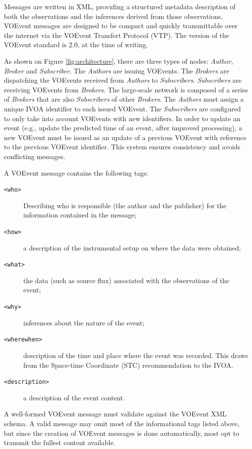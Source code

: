 \documentclass[referee,a4paper,12pt,traditabstract]{swsc}
\begin{document}
\begin{linenumbers}
Messages are written in XML, providing a structured metadata description of both the observations and the inferences derived from those observations. VOEvent messages are designed to be compact and quickly transmittable over the internet via the VOEvent Transfert Protocol (VTP). The version of the VOEvent standard is 2.0, at the time of writing.

As shown on Figure \ref{fig:architecture}, there are three types of nodes: \emph{Author}, \emph{Broker} and \emph{Subscriber}.  The \emph{Authors} are issuing VOEvents. The \emph{Brokers} are dispatching the VOEvents received from \emph{Authors} to \emph{Subscribers}. \emph{Subscribers} are receiving VOEvents from \emph{Brokers}. The large-scale network is composed of a series of \emph{Brokers} that are also \emph{Subscribers} of other \emph{Brokers}. The \emph{Authors} must assign a unique IVOA identifier \cite{ivoid} to each issued VOEvent. The \emph{Subscribers} are configured to only take into account VOEvents with new identifiers. In order to update an event (e.g., update the predicted time of an event, after improved processing), a new VOEvent must be issued as an update of a previous VOEvent with reference to the previous VOEvent identifier. This system ensures consistency and avoids conflicting messages. 

A VOEvent message contains the following tags:
\begin{description}
\item[{\tt <who>}] Describing who is responsible (the author and the publisher) for the information contained in the message;
\item[{\tt <how>}] a description of the instrumental setup on where the data were obtained;
\item[{\tt <what>}] the data (such as source flux) associated with the observations of the event;
\item[{\tt <why>}] inferences about the nature of the event;
\item[{\tt <wherewhen>}] description of the time and place where the event was recorded. This draws from the Space-time Coordinate (STC) recommendation to the IVOA.
\item[{\tt <description>}] a description of the event content.
\end{description}
A well-formed VOEvent message must validate against the VOEvent XML schema. A valid message may omit most of the informational tags listed above, but since the creation of VOEvent messages is done automatically, most opt to transmit the fullest content available.



\end{linenumbers}
\end{document}
